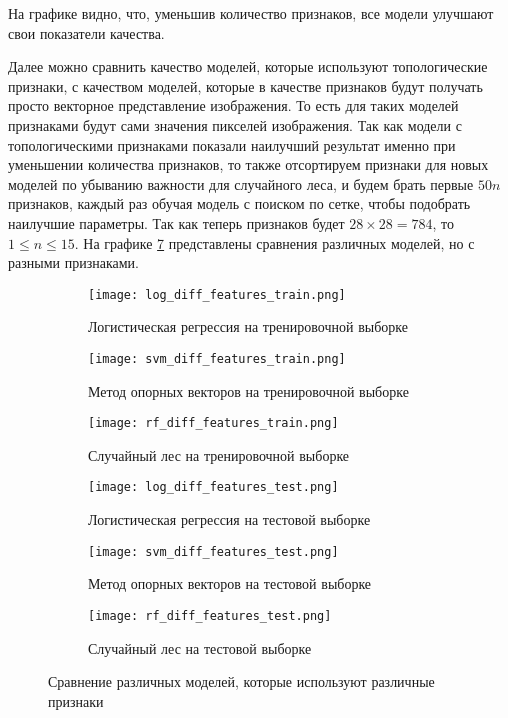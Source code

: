 На графике видно, что, уменьшив количество признаков, все модели улучшают свои показатели качества. 

Далее можно сравнить качество моделей, которые используют топологические признаки, с качеством моделей, которые в качестве признаков будут получать просто векторное представление изображения. То есть для таких моделей признаками будут сами значения пикселей изображения. Так как модели с топологическими признаками показали наилучший результат именно при уменьшении количества признаков, то также отсортируем признаки для новых моделей по убыванию важности для случайного леса, и будем брать первые $50n$ признаков, каждый раз обучая модель с поиском по сетке, чтобы подобрать наилучшие параметры. Так как теперь признаков будет $28 \times 28 = 784$, то $1 \leq n \leq 15$. На графике \ref{accuracies_diff_features} представлены сравнения различных моделей, но с разными признаками. 

\begin{figure}[!htbp]
	    \centering %
	\begin{subfigure}{0.25\textwidth}
		\texttt{[image: log\_diff\_features\_train.png]}
		\caption{Логистическая регрессия на тренировочной выборке}
		\label{fig:1}
	\end{subfigure}\hfil %
	\begin{subfigure}{0.25\textwidth}
		\texttt{[image: svm\_diff\_features\_train.png]}
		\caption{Метод опорных векторов на тренировочной выборке}
		\label{fig:2}
	\end{subfigure}\hfil %
	\begin{subfigure}{0.25\textwidth}
		\texttt{[image: rf\_diff\_features\_train.png]}
		\caption{Случайный лес на тренировочной выборке}
		\label{fig:3}
	\end{subfigure}
	
	\medskip
	\begin{subfigure}{0.25\textwidth}
		\texttt{[image: log\_diff\_features\_test.png]}
		\caption{Логистическая регрессия на тестовой выборке}
		\label{fig:4}
	\end{subfigure}\hfil %
	\begin{subfigure}{0.25\textwidth}
		\texttt{[image: svm\_diff\_features\_test.png]}
		\caption{Метод опорных векторов на тестовой выборке}
		\label{fig:5}
	\end{subfigure}\hfil %
	\begin{subfigure}{0.25\textwidth}
		\texttt{[image: rf\_diff\_features\_test.png]}
		\caption{Случайный лес на тестовой выборке}
		\label{fig:6}
	\end{subfigure}
	\caption{Сравнение различных моделей, которые используют различные признаки}
	\label{accuracies_diff_features}
\end{figure}

